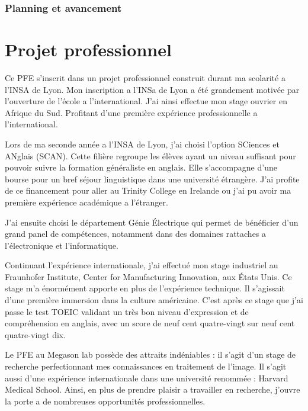 \subsubsection{Planning et avancement}













\section{Projet professionnel}

Ce PFE s'inscrit dans un projet professionnel construit durant ma scolarité a l'INSA de Lyon.
Mon inscription a l'INSa de Lyon a été grandement motivée par l'ouverture de l'école a l'international. J'ai ainsi effectue mon stage ouvrier en Afrique du Sud. Profitant d'une première expérience professionnelle a l'international.

Lors de ma seconde année a l'INSA de Lyon, j'ai choisi l'option SCiences et ANglais (SCAN). Cette filière regroupe les élèves ayant un niveau suffisant pour pouvoir suivre la formation généraliste en anglais. Elle s'accompagne d'une bourse pour un bref séjour linguistique dans une université étrangère. J'ai profite de ce financement pour aller au Trinity College en Irelande ou j'ai pu avoir ma première expérience académique a l'étranger.

J'ai ensuite choisi le département Génie Électrique qui permet de bénéficier d'un grand panel de compétences, notamment dans des domaines rattaches a l'électronique et l'informatique.

Continuant l'expérience internationale, j'ai effectué mon stage industriel au Fraunhofer Institute, Center for Manufacturing Innovation, aux États Unis. Ce stage m'a énormément apporte en plus de l'expérience technique. Il s'agissait d'une première immersion dans la culture américaine. C'est après ce stage que j'ai passe le test TOEIC validant un très bon niveau d'expression et de compréhension en anglais, avec un score de neuf cent quatre-vingt sur neuf cent quatre-vingt dix.

Le PFE au Megason lab possède des attraits indéniables : il s'agit d'un stage de recherche perfectionnant mes connaissances en traitement de l'image. Il s'agit aussi d'une expérience internationale dans une université renommée : Harvard Medical School. Ainsi, en plus de prendre plaisir a travailler en recherche, j'ouvre la porte a de nombreuses opportunités professionnelles.

